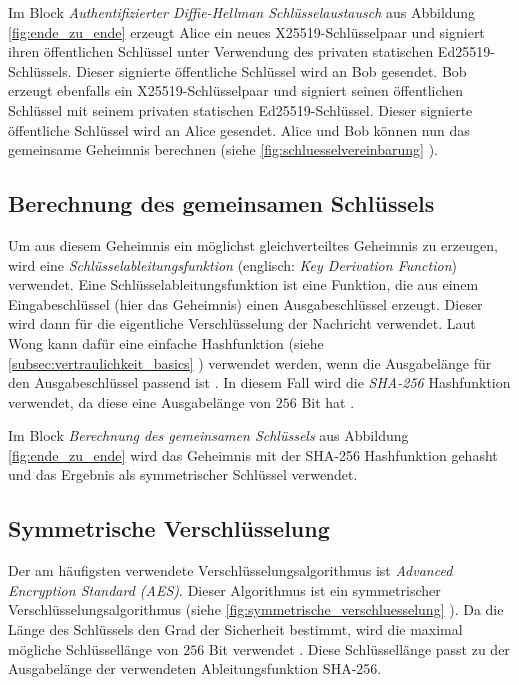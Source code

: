 Im Block \textit{Authentifizierter Diffie-Hellman Schlüsselaustausch} aus Abbildung \ref{fig:ende_zu_ende} erzeugt Alice ein neues X25519-Schlüsselpaar und signiert ihren öffentlichen Schlüssel unter Verwendung des privaten statischen Ed25519-Schlüssels. Dieser signierte öffentliche Schlüssel wird an Bob gesendet. Bob erzeugt ebenfalls ein X25519-Schlüsselpaar und signiert seinen öffentlichen Schlüssel mit seinem privaten statischen Ed25519-Schlüssel. Dieser signierte öffentliche Schlüssel wird an Alice gesendet. Alice und Bob können nun das gemeinsame Geheimnis berechnen (siehe \ref{fig:schluesselvereinbarung} \textit{}).


\subsection{Berechnung des gemeinsamen Schlüssels}

Um aus diesem Geheimnis ein möglichst gleichverteiltes Geheimnis zu erzeugen, wird eine \textit{Schlüsselableitungsfunktion} (englisch: \textit{Key Derivation Function}) verwendet. Eine Schlüsselableitungsfunktion ist eine Funktion, die aus einem Eingabeschlüssel (hier das Geheimnis) einen Ausgabeschlüssel erzeugt. Dieser wird dann für die eigentliche Verschlüsselung der Nachricht verwendet. Laut Wong kann dafür eine einfache Hashfunktion (siehe \ref{subsec:vertraulichkeit_basics} \textit{}) verwendet werden, wenn die Ausgabelänge für den Ausgabeschlüssel passend ist \Parencite[S. 194]{Wong_KryptoPraxis}. In diesem Fall wird die \textit{SHA-256} Hashfunktion verwendet, da diese eine Ausgabelänge von $256$ Bit hat \Parencite{rfc6234_SHA2}.

Im Block \textit{Berechnung des gemeinsamen Schlüssels} aus Abbildung \ref{fig:ende_zu_ende} wird das Geheimnis mit der SHA-256 Hashfunktion gehasht und das Ergebnis als symmetrischer Schlüssel verwendet.


\subsection{Symmetrische Verschlüsselung}

Der am häufigsten verwendete Verschlüsselungsalgorithmus ist \textit{Advanced Encryption Standard (AES)}. Dieser Algorithmus ist ein symmetrischer Verschlüsselungsalgorithmus (siehe \ref{fig:symmetrische_verschluesselung} \textit{}). Da die Länge des Schlüssels den Grad der Sicherheit bestimmt, wird die maximal mögliche Schlüssellänge von $256$ Bit verwendet \parencite[S. 76]{Wong_KryptoPraxis}. 
Diese Schlüssellänge passt zu der Ausgabelänge der verwendeten Ableitungsfunktion SHA-256.

